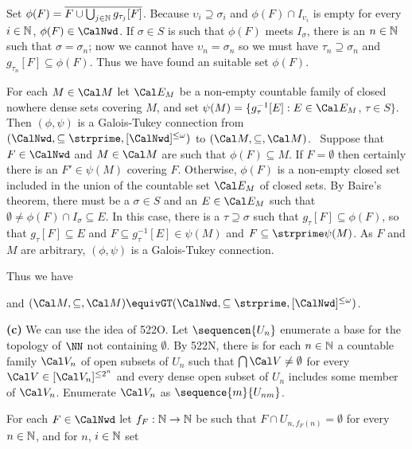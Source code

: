 {Set $\phi(F)=\overline{F\cup\bigcup_{j\in\Bbb N}g_{\tau_j}[F]}$.
Because $\upsilon_i\supseteq\sigma_i$ and $\phi(F)\cap I_{\upsilon_i}$ is
empty for every $i\in\Bbb N$, $\phi(F)\in\CalNwd$.
If $\sigma\in S$ is such that $\phi(F)$ meets $I_{\sigma}$, there is
an $n\in\Bbb N$ such that $\sigma=\sigma_n$;  now we cannot have
$\upsilon_n=\sigma_n$ so we must have
$\tau_n\supseteq\sigma_n$ and $g_{\tau_n}[F]\subseteq\phi(F)$.   Thus we
have found an suitable set $\phi(F)$.\ \Qed

For each $M\in\Cal M$ let $\Cal E_M$ be a non-empty countable family of
closed nowhere dense sets covering $M$, and set
$\psi(M)=\{g_{\tau}^{-1}[E]:E\in\Cal E_M$, $\tau\in S\}$.
Then $(\phi,\psi)$ is a Galois-Tukey connection from
$(\CalNwd,\subseteq\strprime,[\CalNwd]^{\le\omega})$ to
$(\Cal M,\subseteq,\Cal M)$.   \Prf\ Suppose that $F\in\CalNwd$ and
$M\in\Cal M$ are such that $\phi(F)\subseteq M$.
If $F=\emptyset$ then certainly there is an $F'\in\psi(M)$ covering $F$.
Otherwise, $\phi(F)$ is a non-empty closed set included in the union of
the countable set $\Cal E_M$ of closed sets.   By Baire's theorem, there
must be a $\sigma\in S$ and an $E\in\Cal E_M$ such that
$\emptyset\ne\phi(F)\cap I_{\sigma}\subseteq E$.
In this case, there is a $\tau\supseteq\sigma$ such that
$g_{\tau}[F]\subseteq\phi(F)$, so that
$g_{\tau}[F]\subseteq E$ and $F\subseteq g_{\tau}^{-1}[E]\in\psi(M)$ and
$F\subseteq\strprime\psi(M)$.   As $F$ and $M$ are arbitrary,
$(\phi,\psi)$ is a Galois-Tukey connection.\ \Qed

\medskip

 Thus we have


\noindent and $(\Cal M,\subseteq,\Cal M)
\equivGT(\CalNwd,\subseteq\strprime,[\CalNwd]^{\le\omega})$.

\medskip

{\bf (c)} We can use the idea of 522O.   Let $\sequencen{U_n}$ enumerate
a base for the topology of $\NN$ not containing $\emptyset$.
By 522N, there is for each
$n\in\Bbb N$ a countable family $\Cal V_n$
of open subsets of $U_n$ such that $\bigcap\Cal V\ne\emptyset$ for every
$\Cal V\in[\Cal V_n]^{\le 2^n}$ and every dense open subset of $U_n$
includes some member of $\Cal V_n$.   Enumerate $\Cal V_n$
as $\sequence{m}{U_{nm}}$.

For each $F\in\CalNwd$ let $f_F:\Bbb N\to\Bbb N$ be such that
$F\cap U_{n,f_F(n)}=\emptyset$ for every $n\in\Bbb N$, and for $n$,
$i\in\Bbb N$ set

}
